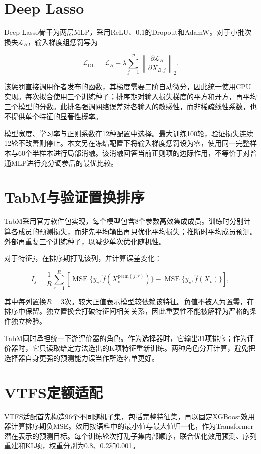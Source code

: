 \documentclass{sufethesismas}
\begin{document}
\section{Deep Lasso}

Deep Lasso骨干为两层MLP，采用ReLU、0.1的Dropout和AdamW。对于小批次损失\(\mathcal L_B\)，输入梯度组惩罚写为

\[
\mathcal L_{\mathrm{DL}}
=\mathcal L_B+
\lambda\sum_{j=1}^{p}
\left\|\frac{\partial\mathcal L_B}{\partial X_{B,j}}\right\|_2.
\]

该惩罚直接调用作者发布的函数，其梯度需要二阶自动微分，因此统一使用CPU实现。每次拟合使用三个训练种子；排序期对输入损失梯度的平方和开方，再平均三个模型的分数。此排名强调网络误差对各输入的敏感性，而非稀疏线性系数，也不提供单个特征的显著性概率。

模型宽度、学习率与正则系数在12种配置中选择。最大训练100轮，验证损失连续12轮不改善则停止。本文另在冻结配置下将输入梯度惩罚设为零，使用同一完整样本与60个半样本进行局部消融。该消融回答当前正则项的边际作用，不等价于对普通MLP进行充分调参后的最优比较。

\section{TabM与验证置换排序}

TabM采用官方软件包实现，每个模型包含8个参数高效集成成员。训练时分别计算各成员的预测损失，而非先平均输出再只优化平均损失；推断时平均成员预测。外部再重复三个训练种子，以减少单次优化随机性。

对于特征\(j\)，在排序期打乱该列，并计算误差变化：

\[
I_j=\frac1{R}\sum_{r=1}^{R}
\left[\operatorname{MSE}\{y_v,\widehat f(X_v^{\mathrm{perm}(j,r)})\}
-\operatorname{MSE}\{y_v,\widehat f(X_v)\}\right],
\]

其中每列置换\(R=3\)次。较大正值表示模型较依赖该特征。负值不被人为置零，在排序中保留。独立置换会打破特征间相关关系，因此重要性不能被解释为严格的条件独立检验。

TabM同时承担统一下游评价器的角色。作为选择器时，它输出31项排序；作为评价器时，它只读取给定方法选出的K项特征重新训练。两种角色分开计算，避免把选择器自身更强的预测能力误当作所选名单更好。

\section{VTFS定额适配}

VTFS适配首先构造96个不同随机子集，包括完整特征集，再以固定XGBoost效用器计算排序期负MSE。效用按语料中的最小值与最大值归一化，作为Transformer潜在表示的预测目标。每个训练轮次打乱子集内部顺序，联合优化效用预测、序列重建和KL项，权重分别为0.8、0.2和0.001。
\end{document}

